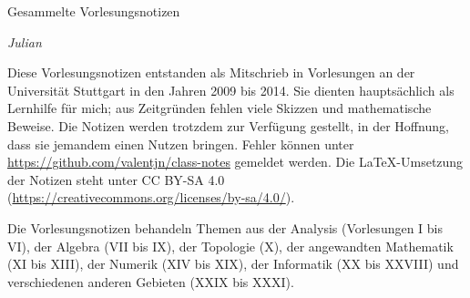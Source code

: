 
\ihead{\leftmark}
\ifoot{\vspace{-1.5mm}\rightmark}

\thispagestyle{empty}
\vspace*{1em}

{%
  \huge%
  Gesammelte Vorlesungsnotizen%
}
\vspace*{1em}

\emph{Julian }

\vspace*{1em}

Diese Vorlesungsnotizen entstanden als Mitschrieb in Vorlesungen
an der Universität Stuttgart in den Jahren 2009 bis 2014.
Sie dienten hauptsächlich als Lernhilfe für mich;
aus Zeitgründen fehlen viele Skizzen und mathematische Beweise.
Die Notizen werden trotzdem zur Verfügung gestellt, in der Hoffnung,
dass sie jemandem einen Nutzen bringen.
Fehler können unter \url{https://github.com/valentjn/class-notes} gemeldet werden.
Die \LaTeX{}-Umsetzung der Notizen steht unter CC BY-SA 4.0
(\url{https://creativecommons.org/licenses/by-sa/4.0/}).

Die Vorlesungsnotizen behandeln Themen aus
der Analysis (Vorlesungen I bis VI),
der Algebra (VII bis IX),
der Topologie (X),
der angewandten Mathematik (XI bis XIII),
der Numerik (XIV bis XIX),
der Informatik (XX bis XXVIII) und
verschiedenen anderen Gebieten (XXIX bis XXXI).

{%
  \setcounter{tocdepth}{\parttocdepth}


  \makeatletter
  \renewcommand*{\@pnumwidth}{2.7em}
  \renewcommand*{\@tocrmarg}{2.7em}
  \makeatother

  \renewcommand*{\contentsname}{Vorlesungen}
  \tableofcontents%
}

\pagebreak

{%

  \setcounter{tocdepth}{\subsubsectiontocdepth}

  \tableofcontents%
}

\pagebreak



